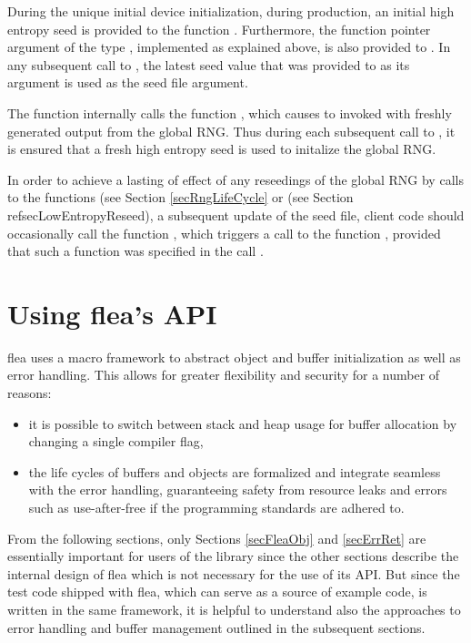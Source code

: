 \documentclass[a4paper,11pt]{scrartcl}
\begin{document}
During the unique initial device initialization, \eg
during production, an initial high entropy seed is provided to the
function \funcLibInit. Furthermore, the function pointer argument of the type
\funcSaveRngState, implemented as explained above, is also provided to
\funcLibInit. In any subsequent call to \funcLibInit, the latest seed value that was
provided to \funcSaveRngState as its argument is used as the seed file argument.

The function \funcLibInit internally calls the function
, which causes \funcSaveRngState to
invoked with freshly generated output from the global RNG. Thus during each
subsequent call to \funcLibInit, it is ensured that a fresh high entropy seed is
used to initalize the global RNG.

In order to achieve a lasting of effect of any reseedings of the global RNG
by calls to the functions   (see
Section \ref{secRngLifeCycle} or
 (see Section
ref{secLowEntropyReseed}), \ie a subsequent update of the seed file, client code
should occasionally call the function
, which triggers a call to the
function \funcSaveRngState, provided that such a function was specified in the
call \funcLibInit.

\section{Using flea's API}

flea uses a macro framework to abstract object and buffer initialization as well
as error handling. This allows for greater flexibility and security for a number of reasons:
\begin{itemize}
  \item it is possible to switch between stack and heap usage for buffer allocation
  by changing a single compiler flag,
  \item the life cycles of buffers and objects are formalized and integrate
    seamless with the error handling, guaranteeing safety from resource leaks
    and errors such as use-after-free if the programming standards are adhered
    to.
\end{itemize}

From the following sections, only Sections \ref{secFleaObj} and \ref{secErrRet}
are essentially
important for users of the library since the other sections describe the
internal design of flea which is not necessary for the use of its API. But since
the test code shipped with flea, which can serve as a source of example code, is
written in the same framework, it is helpful to understand also the approaches
to error handling and buffer management outlined in the subsequent sections.
\end{document}
